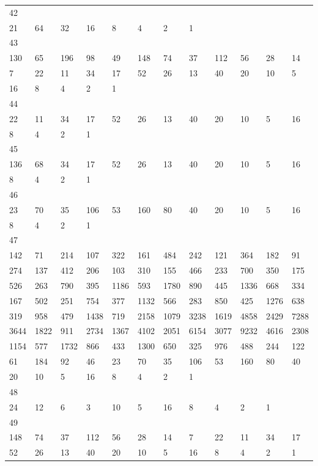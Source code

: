 \begin{longtable}{llllllllllll}
42&&&&&&&&&&&\\
21& 64& 32& 16& 8& 4& 2& 1& \\

43&&&&&&&&&&&\\
130& 65& 196& 98& 49& 148& 74& 37& 112& 56& 28& 14\\
7& 22& 11& 34& 17& 52& 26& 13& 40& 20& 10& 5\\
16& 8& 4& 2& 1& \\

44&&&&&&&&&&&\\
22& 11& 34& 17& 52& 26& 13& 40& 20& 10& 5& 16\\
8& 4& 2& 1& \\

45&&&&&&&&&&&\\
136& 68& 34& 17& 52& 26& 13& 40& 20& 10& 5& 16\\
8& 4& 2& 1& \\

46&&&&&&&&&&&\\
23& 70& 35& 106& 53& 160& 80& 40& 20& 10& 5& 16\\
8& 4& 2& 1& \\

47&&&&&&&&&&&\\
142& 71& 214& 107& 322& 161& 484& 242& 121& 364& 182& 91\\
274& 137& 412& 206& 103& 310& 155& 466& 233& 700& 350& 175\\
526& 263& 790& 395& 1186& 593& 1780& 890& 445& 1336& 668& 334\\
167& 502& 251& 754& 377& 1132& 566& 283& 850& 425& 1276& 638\\
319& 958& 479& 1438& 719& 2158& 1079& 3238& 1619& 4858& 2429& 7288\\
3644& 1822& 911& 2734& 1367& 4102& 2051& 6154& 3077& 9232& 4616& 2308\\
1154& 577& 1732& 866& 433& 1300& 650& 325& 976& 488& 244& 122\\
61& 184& 92& 46& 23& 70& 35& 106& 53& 160& 80& 40\\
20& 10& 5& 16& 8& 4& 2& 1& \\

48&&&&&&&&&&&\\
24& 12& 6& 3& 10& 5& 16& 8& 4& 2& 1& \\

49&&&&&&&&&&&\\
148& 74& 37& 112& 56& 28& 14& 7& 22& 11& 34& 17\\
52& 26& 13& 40& 20& 10& 5& 16& 8& 4& 2& 1\\


\end{longtable}
